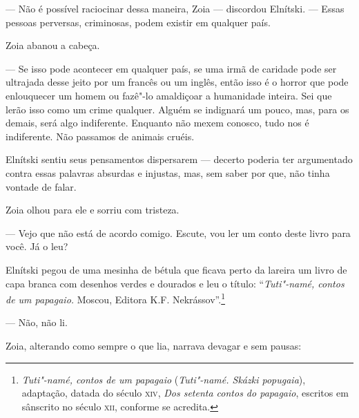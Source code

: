 --- Não é possível raciocinar dessa maneira, Zoia --- discordou
Elnítski. --- Essas pessoas perversas, criminosas, podem existir em
qualquer país.

Zoia abanou a cabeça.

--- Se isso pode acontecer em qualquer país, se uma irmã de caridade
pode ser ultrajada desse jeito por um francês ou um inglês, então isso é
o horror que pode enlouquecer um homem ou fazê"-lo amaldiçoar a
humanidade inteira. Sei que lerão isso como um crime qualquer. Alguém se
indignará um pouco, mas, para os demais, será algo indiferente. Enquanto
não mexem conosco, tudo nos é indiferente. Não passamos de animais
cruéis.

Elnítski sentiu seus pensamentos dispersarem --- decerto poderia ter
argumentado contra essas palavras absurdas e injustas, mas, sem saber
por que, não tinha vontade de falar.

Zoia olhou para ele e sorriu com tristeza.

--- Vejo que não está de acordo comigo. Escute, vou ler um conto deste
livro para você. Já o leu?

Elnítski pegou de uma mesinha de bétula que ficava perto da lareira um
livro de capa branca com desenhos verdes e dourados e leu o título:
``\emph{Tuti"-namé, contos de um papagaio.} Moscou, Editora K.F.
Nekrássov''.\footnote{\emph{Tuti"-namé, contos de um
  papagaio} (\emph{Tuti"-namé. Skázki popugaia}), adaptação, datada do
  século \textsc{xiv}, \emph{Dos setenta contos do papagaio}, escritos em sânscrito no
  século \textsc{xii}, conforme se acredita.}

--- Não, não li.

Zoia, alterando como sempre o que lia, narrava devagar e sem pausas:

